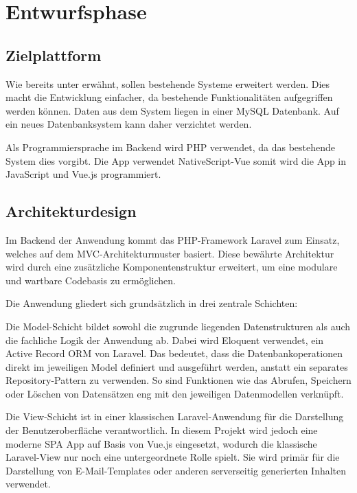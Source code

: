 \section{Entwurfsphase} 
\label{sec:Entwurfsphase}

\subsection{Zielplattform}
\label{sec:Zielplattform}
	Wie bereits unter  erwähnt, sollen bestehende Systeme erweitert werden.
	Dies macht die Entwicklung einfacher, da bestehende Funktionalitäten aufgegriffen werden können.
	Daten aus dem System liegen in einer MySQL Datenbank. Auf ein neues Datenbanksystem kann daher verzichtet werden.

	Als Programmiersprache im Backend wird \ac{PHP} verwendet, da das bestehende System dies vorgibt.
	Die App verwendet NativeScript-Vue somit wird die App in JavaScript und Vue.js programmiert.


\subsection{Architekturdesign}
\label{sec:Architekturdesign}
	Im Backend der Anwendung kommt das \ac{PHP}-Framework Laravel zum Einsatz, welches auf dem \ac{MVC}-Architekturmuster basiert.
	Diese bewährte Architektur wird durch eine zusätzliche Komponentenstruktur erweitert, um eine modulare und wartbare Codebasis zu ermöglichen.

	Die Anwendung gliedert sich grundsätzlich in drei zentrale Schichten:

	Die Model-Schicht bildet sowohl die zugrunde liegenden Datenstrukturen als auch die fachliche Logik der Anwendung ab.
	Dabei wird Eloquent verwendet, ein Active Record \ac{ORM} von Laravel. Das bedeutet, dass die Datenbankoperationen
	direkt im jeweiligen Model definiert und ausgeführt werden, anstatt ein separates Repository-Pattern zu verwenden.
	So sind Funktionen wie das Abrufen, Speichern oder Löschen von Datensätzen eng mit den jeweiligen Datenmodellen verknüpft.

	Die View-Schicht ist in einer klassischen Laravel-Anwendung für die Darstellung der Benutzeroberfläche verantwortlich.
	In diesem Projekt wird jedoch eine moderne \ac{SPA} \bzw App auf Basis von Vue.js eingesetzt,
	wodurch die klassische Laravel-View nur noch eine untergeordnete Rolle spielt.
	Sie wird primär für die Darstellung von E-Mail-Templates oder anderen serverseitig generierten Inhalten verwendet.


